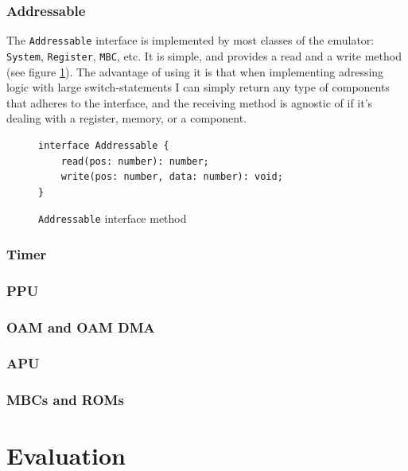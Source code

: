 \documentclass[11pt]{report}
\begin{document}
\subsection{Addressable}

The \texttt{Addressable} interface is implemented by most classes of the emulator: \texttt{System}, \texttt{Register}, \texttt{MBC}, etc. It is simple, and provides a read and a write method (see figure \ref{fig:addressable}). The advantage of using it is that when implementing adressing logic with large switch-statements I can simply return any type of components that adheres to the interface, and the receiving method is agnostic of if it's dealing with a register, memory, or a component.

\begin{figure}[h]
    \begin{verbatim}
interface Addressable {
    read(pos: number): number;
    write(pos: number, data: number): void;
}
    \end{verbatim}
    \caption{\texttt{Addressable} interface method}
    \label{fig:addressable}
\end{figure}

\subsection{Timer}
\subsection{PPU}
\subsection{OAM and OAM DMA}
\subsection{APU}
\subsection{MBCs and ROMs}

\chapter{Evaluation}


\clearpage

\printnoidxglossary[type=\acronymtype]

\printnoidxglossary[type=main]

\printbibliography
\end{document}
